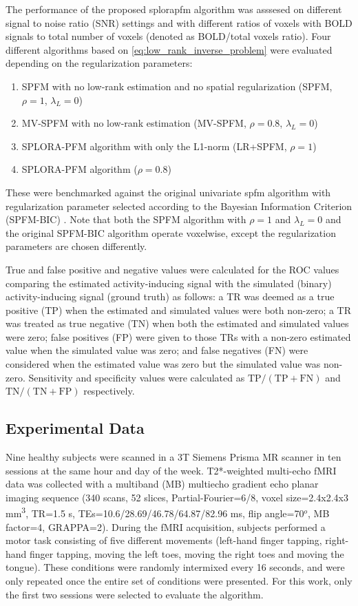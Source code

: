 The performance of the proposed \acrshort*{splorapfm} algorithm was asssesed on
different signal to noise ratio (SNR) settings and with different ratios of
voxels with BOLD signals to total number of voxels (denoted as BOLD/total voxels
ratio). Four different algorithms based on \cref{eq:low_rank_inverse_problem}
were evaluated depending on the regularization parameters: 
\begin{enumerate}
    \item SPFM with no low-rank estimation and no spatial regularization (SPFM,
    $\rho=1$, $\lambda_L=0$)
    \item MV-SPFM with no low-rank estimation (MV-SPFM, $\rho = 0.8$,
    $\lambda_L=0$)
    \item SPLORA-PFM algorithm with only the L1-norm (LR+SPFM, $\rho=1$)
    \item SPLORA-PFM algorithm ($\rho = 0.8$)
\end{enumerate}
These were benchmarked against the original univariate \acrshort*{spfm}
algorithm with regularization parameter selected according to the Bayesian
Information Criterion (SPFM-BIC) \citep{Gaudes2013Paradigmfreemapping}. Note
that both the SPFM algorithm with $\rho=1$ and $\lambda_L=0$ and the original
SPFM-BIC algorithm operate voxelwise, except the regularization parameters are
chosen differently.

True and false positive and negative values were calculated for the ROC values
comparing the estimated activity-inducing signal with the simulated (binary)
activity-inducing signal (ground truth) as follows: a TR was deemed as a true
positive (TP) when the estimated and simulated values were both non-zero; a TR
was treated as true negative (TN) when both the estimated and simulated values
were zero; false positives (FP) were given to those TRs with a non-zero
estimated value when the simulated value was zero; and false negatives (FN) were
considered when the estimated value was zero but the simulated value was
non-zero. Sensitivity and specificity values were calculated as
$\text{TP}/(\text{TP}+\text{FN})$ and $\text{TN}/(\text{TN}+\text{FP})$
respectively.

\subsection{Experimental Data}

Nine healthy subjects were scanned in a 3T Siemens Prisma MR scanner in ten
sessions at the same hour and day of the week. T2*-weighted multi-echo fMRI data
was collected with a multiband (MB) multiecho gradient echo planar imaging
sequence (340 scans, 52 slices, Partial-Fourier=6/8, voxel size=2.4x2.4x3
mm\textsuperscript{3}, TR=1.5 s, TEs=10.6/28.69/46.78/64.87/82.96 ms, flip
angle=70$^o$, MB factor=4, GRAPPA=2). During the fMRI acquisition, subjects
performed a motor task consisting of five different movements (left-hand finger
tapping, right-hand finger tapping, moving the left toes, moving the right toes
and moving the tongue). These conditions were randomly intermixed every 16
seconds, and were only repeated once the entire set of conditions were
presented. For this work, only the first two sessions were selected to evaluate
the algorithm. 

